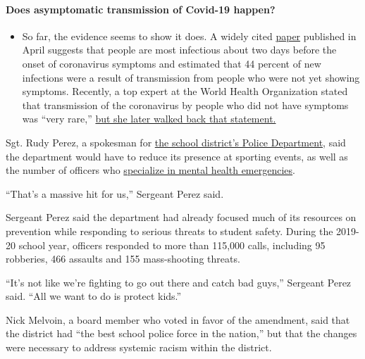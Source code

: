 \begin{itemize}
{  \paragraph{Does asymptomatic transmission of Covid-19
  happen?}\label{does-asymptomatic-transmission-of-covid-19-happen}}

  \begin{itemize}
  \tightlist
  \item
    So far, the evidence seems to show it does. A widely cited
    \href{https://www.nature.com/articles/s41591-020-0869-5}{paper}
    published in April suggests that people are most infectious about
    two days before the onset of coronavirus symptoms and estimated that
    44 percent of new infections were a result of transmission from
    people who were not yet showing symptoms. Recently, a top expert at
    the World Health Organization stated that transmission of the
    coronavirus by people who did not have symptoms was ``very rare,''
    \href{https://www.nytimes.com/2020/06/09/world/coronavirus-updates.html?action=click\&pgtype=Article\&state=default\&region=MAIN_CONTENT_3\&context=storylines_faq\#link-1f302e21}{but
    she later walked back that statement.}
  \end{itemize}
\end{itemize}

Sgt. Rudy Perez, a spokesman for
\href{https://achieve.lausd.net/laspd}{the school district's Police
Department}, said the department would have to reduce its presence at
sporting events, as well as the number of officers who
\href{https://www.nytimes.com/2016/04/26/health/police-mental-illness-crisis-intervention.html}{specialize
in mental health emergencies}.

``That's a massive hit for us,'' Sergeant Perez said.

Sergeant Perez said the department had already focused much of its
resources on prevention while responding to serious threats to student
safety. During the 2019-20 school year, officers responded to more than
115,000 calls, including 95 robberies, 466 assaults and 155
mass-shooting threats.

``It's not like we're fighting to go out there and catch bad guys,''
Sergeant Perez said. ``All we want to do is protect kids.''

Nick Melvoin, a board member who voted in favor of the amendment, said
that the district had ``the best school police force in the nation,''
but that the changes were necessary to address systemic racism within
the district.

